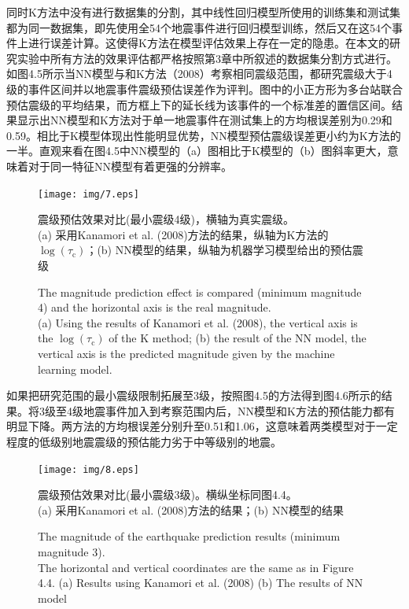 \indent 同时K方法中没有进行数据集的分割，其中线性回归模型所使用的训练集和测试集都为同一数据集，即先使用全54个地震事件进行回归模型训练，然后又在这54个事件上进行误差计算。这使得K方法在模型评估效果上存在一定的隐患。在本文的研究实验中所有方法的效果评估都严格按照第3章中所叙述的数据集分割方式进行。\\
\indent 如图4.5所示当NN模型与和K方法（2008）考察相同震级范围，都研究震级大于4级的事件区间并以地震事件震级预估误差作为评判。图中的小正方形为多台站联合预估震级的平均结果，而方框上下的延长线为该事件的一个标准差的置信区间。结果显示出NN模型和K方法对于单一地震事件在测试集上的方均根误差别为0.29和0.59。相比于K模型体现出性能明显优势，NN模型预估震级误差更小约为K方法的一半。直观来看在图4.5中NN模型的（a）图相比于K模型的（b）图斜率更大，意味着对于同一特征NN模型有着更强的分辨率。\\
\begin{figure}[!h] 
\centering 
\texttt{[image: img/7.eps]} 
\renewcommand{\figurename}{图} 
\caption{震级预估效果对比(最小震级4级)，横轴为真实震级。\\
(a) 采用Kanamori et al. (2008)方法的结果，纵轴为K方法的$\log \left(\tau_{\mathrm{c}}\right)$；(b) NN模型的结果，纵轴为机器学习模型给出的预估震级} 
\addtocounter{figure}{-1} \vspace{-5pt} 
\renewcommand{\figurename}{Fig} 
\caption{The magnitude prediction effect is compared (minimum magnitude 4) and the horizontal axis is the real magnitude.\\
(a) Using the results of Kanamori et al. (2008), the vertical axis is the $\log \left(\tau_{\mathrm{c}}\right)$ of the K method; (b) the result of the NN model, the vertical axis is the predicted magnitude given by the machine learning model.} 
\renewcommand{\figurename}{图} 
\label{fig:network-device-influence.png} 
\end{figure}
\indent 如果把研究范围的最小震级限制拓展至3级，按照图4.5的方法得到图4.6所示的结果。将3级至4级地震事件加入到考察范围内后，NN模型和K方法的预估能力都有明显下降。两方法的方均根误差分别升至0.51和1.06，这意味着两类模型对于一定程度的低级别地震震级的预估能力劣于中等级别的地震。\\
\begin{figure}[!h] 
\centering 
\texttt{[image: img/8.eps]} 
\renewcommand{\figurename}{图} 
\caption{ 震级预估效果对比(最小震级3级)。横纵坐标同图4.4。\\
(a) 采用Kanamori et al. (2008)方法的结果；(b) NN模型的结果} 
\addtocounter{figure}{-1} \vspace{-5pt} 
\renewcommand{\figurename}{Fig} 
\caption{The magnitude of the earthquake prediction results (minimum magnitude 3). \\
The horizontal and vertical coordinates are the same as in Figure 4.4.
(a) Results using Kanamori et al. (2008) (b) The results of NN model} 
\renewcommand{\figurename}{图} 
\label{fig:network-device-influence.png} 
\end{figure}
